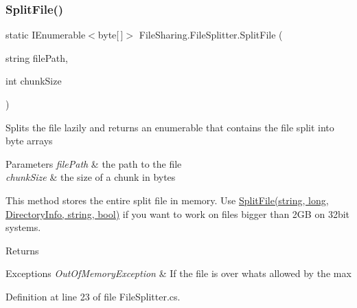 \subsubsection{\texorpdfstring{Split\+File()}{SplitFile()}\hspace{0.1cm}{\footnotesize\ttfamily [1/2]}}
{\footnotesize\ttfamily static I\+Enumerable$<$byte\mbox{[}$\,$\mbox{]}$>$ File\+Sharing.\+File\+Splitter.\+Split\+File (\begin{DoxyParamCaption}\item[{string}]{file\+Path,  }\item[{int}]{chunk\+Size }\end{DoxyParamCaption})\hspace{0.3cm}{\ttfamily [static]}}



Splits the file lazily and returns an enumerable that contains the file split into byte arrays 


\begin{DoxyParams}{Parameters}
{\em file\+Path} & the path to the file\\
\hline
{\em chunk\+Size} & the size of a chunk in bytes\\
\hline
\end{DoxyParams}


This method stores the entire split file in memory. Use \hyperlink{class_file_sharing_1_1_file_splitter_aa0f7dc920db0a5bd0f7ae992298d1198}{Split\+File(string, long, Directory\+Info, string, bool)} if you want to work on files bigger than 2\+GB on 32bit systems. 

\begin{DoxyReturn}{Returns}

\end{DoxyReturn}

\begin{DoxyExceptions}{Exceptions}
{\em Out\+Of\+Memory\+Exception} & If the file is over whats allowed by the max\\
\hline
\end{DoxyExceptions}


Definition at line 23 of file File\+Splitter.\+cs.

\mbox{\label{class_file_sharing_1_1_file_splitter_aa0f7dc920db0a5bd0f7ae992298d1198}} 
